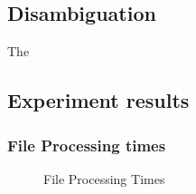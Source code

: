 \documentclass[article,dr=phil,type=drfinal,colorback,accentcolor=tud9c]{tudthesis}
\begin{document}
\newpage
\subsection{Disambiguation}

The 

\newpage
\subsection{Experiment results}
\subsubsection{File Processing times}
\begin{figure}[!htb]
	\centering
	\hspace{10mm}
	\caption[File Processing Times]{File Processing Times}
	\label{fig:fileprocessing}
\end{figure}
\end{document}
